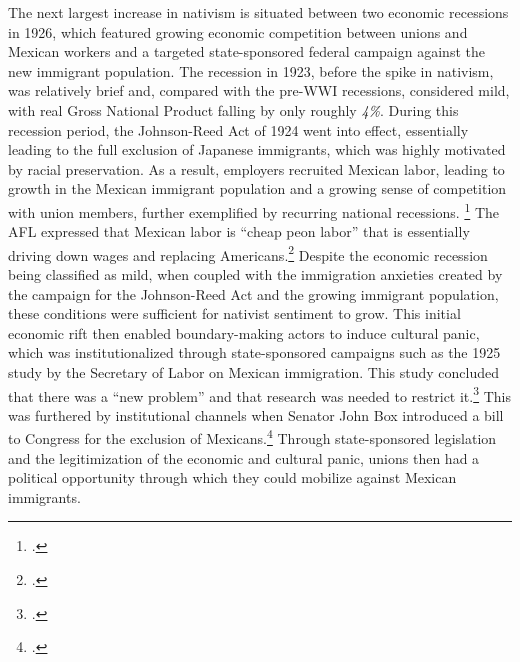 \documentclass[12pt,a4paper]{article}
\begin{document}
The next largest increase in nativism is situated between two economic recessions in 1926, which featured growing economic competition between unions and Mexican workers and a targeted state-sponsored federal campaign against the new immigrant population. The recession in 1923, before the spike in nativism, was relatively brief and, compared with the pre-WWI recessions, considered mild, with real Gross National Product falling by only roughly \textit{4\%}. During this recession period, the Johnson-Reed Act of 1924 went into effect, essentially leading to the full exclusion of Japanese immigrants, which was highly motivated by racial preservation. As a result, employers recruited Mexican labor, leading to growth in the Mexican immigrant population and a growing sense of competition with union members, further exemplified by recurring national recessions. \footcite{gomez_rhetorics_2024} The AFL expressed that Mexican labor is ``cheap peon labor'' that is essentially driving down wages and replacing Americans.\footcite{reisler_always_1976} Despite the economic recession being classified as mild, when coupled with the immigration anxieties created by the campaign for the Johnson-Reed Act and the growing immigrant population, these conditions were sufficient for nativist sentiment to grow. This initial economic rift then enabled boundary-making actors to induce cultural panic, which was institutionalized through state-sponsored campaigns such as the 1925 study by the Secretary of Labor on Mexican immigration. This study concluded that there was a ``new problem'' and that research was needed to restrict it.\footcite{calderon-zaks_debated_2011} This was furthered by institutional channels when Senator John Box introduced a bill to Congress for the exclusion of Mexicans.\footcite{calderon-zaks_debated_2011} Through state-sponsored legislation and the legitimization of the economic and cultural panic, unions then had a political opportunity through which they could mobilize against Mexican immigrants. 
\end{document}
